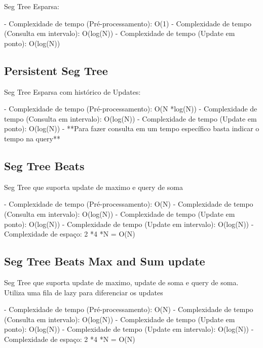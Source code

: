 \documentclass[11pt, a4paper, twoside]{article}
\begin{document}
Seg Tree Esparsa:

- Complexidade de tempo (Pré-processamento): O(1)
- Complexidade de tempo (Consulta em intervalo): O(log(N))
- Complexidade de tempo (Update em ponto): O(log(N))

\subsection{Persistent Seg Tree}

Seg Tree Esparsa com histórico de Updates:

- Complexidade de tempo (Pré-processamento): O(N *log(N))
- Complexidade de tempo (Consulta em intervalo): O(log(N))
- Complexidade de tempo (Update em ponto): O(log(N))
- **Para fazer consulta em um tempo específico basta indicar o tempo na query**

\subsection{Seg Tree Beats}

Seg Tree que suporta update de maximo e query de soma

- Complexidade de tempo (Pré-processamento): O(N)
- Complexidade de tempo (Consulta em intervalo): O(log(N))
- Complexidade de tempo (Update em ponto): O(log(N))
- Complexidade de tempo (Update em intervalo): O(log(N))
- Complexidade de espaço: 2 *4 *N = O(N)

\subsection{Seg Tree Beats Max and Sum update}

Seg Tree que suporta update de maximo, update de soma e query de soma.
Utiliza uma fila de lazy para diferenciar os updates

- Complexidade de tempo (Pré-processamento): O(N)
- Complexidade de tempo (Consulta em intervalo): O(log(N))
- Complexidade de tempo (Update em ponto): O(log(N))
- Complexidade de tempo (Update em intervalo): O(log(N))
- Complexidade de espaço: 2 *4 *N = O(N)
\end{document}
